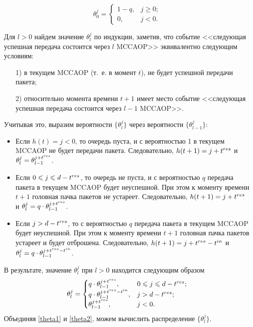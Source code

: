 \begin{equation}
	\label{theta1}
	\theta_0^j = \begin{cases}
	1-q, &j \geqslant 0; \\
	0, &j < 0.
	\end{cases}
\end{equation}

Для $l > 0$ найдем значение $\theta_l^j$ по индукции, заметив, что событие <<следующая успешная передача состоится через $l$ MCCAOP>> эквивалентно следующим условиям:
\begin{itemize}
	\item[1)] в текущем MCCAOP (т.~е. в момент $t$), не будет успешной передачи пакета;
	\item[2)] относительно момента времени $t + 1$ имеет место событие <<следующая успешная передача состоится через $l-1$ MCCAOP>>.
\end{itemize}


Учитывая это, выразим вероятности $\{\theta_l^j\}$ через вероятности $\{\theta_{l-1}^j\}$:
\begin{itemize}
	\item Если $h(t) = j < 0$, то очередь пуста, и с вероятностью 1 в текущем MCCAOP не будет передачи пакета. Следовательно, $h(t+1)=j+t^{res}$ и $\theta_{l}^j = \theta_{l-1}^{j+t^{res}}$.
	\item Если $0 \leqslant j \leqslant d - t^{res}$, то очередь не пуста, и с вероятностью $q$ передача пакета в текущем MCCAOP будет неуспешной. При этом к моменту времени $t + 1$ головная пачка пакетов не устареет. Следовательно, $h(t + 1) = j + t^{res}$ и $\theta_{l}^j = 
q \cdot\theta_{l-1}^{j+t^{res}}$.
	\item Если $j > d - t^{res}$, то с вероятностью $q$ передача пакета в текущем MCCAOP будет неуспешной. При этом к моменту времени $t + 1$ головная пачка пакетов устареет и будет отброшена. Следовательно, $h(t + 1) = j + t^{res} - t^{in}$ и $\theta_{l}^j  = q \cdot \theta_{l-1}^{j+t^{res}-t^{in}}$.
\end{itemize}

В результате, значение $\theta_{l}^j$ при $l > 0$ находится следующим образом
\begin{equation}
	\label{theta2}
	\theta_{l}^j = \begin{cases}
		q\cdot \theta_{l-1}^{j+t^{res}}, & 0 \leqslant j \leqslant d - t^{res}; \\
		q\cdot \theta_{l-1}^{j+t^{res}-t^{in}}, &j > d - t^{res}; \\
		\theta_{l-1}^{j+t^{res}}, &j < 0. 
	\end{cases}
\end{equation} 
Объединяя \eqref{theta1} и \eqref{theta2}, можем вычислить распределение $\{\theta_l^j\}$. 

